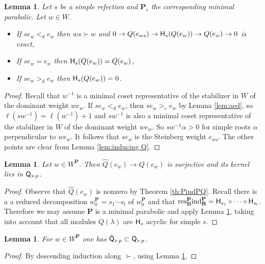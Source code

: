 \documentclass[sn-mathphys-num]{sn-jnl}%
\newcommand{\ind}{{\mathrm{ind}}}
\newcommand{\res}{{\mathrm{res}}}
\newcommand{\sH}{{\sf H}}
\newcommand{\fb}{\mathbf B}
\newcommand{\bp}{\mathbf P}
\newtheorem{lemma}[theorem]{Lemma}
\theoremstyle{definition}
\begin{document}
\begin{lemma}\label{lem:ind of Q(e_w)}
Let $s$ be a simple refection and $\bp_s$ the corresponding minimal parabolic. 
Let $w\in W$.
\begin{itemize}
\item If $se_w<_de_w$ then $ws\succ w$ and $0\to Q(e_{ws})\to{\sH_s}(Q(e_w))\to Q(e_w)\to 0$ is exact,
\item If $se_w=e_w$ then ${\sH_s}(Q(e_w))=Q(e_w)$,
\item If $se_w>_de_w$ then ${\sH_s}(Q(e_w))=0$.
\end{itemize}
\end{lemma}
\begin{proof}Recall that $w^{-1}$ is a minimal coset representative of the stabilizer in $W$ of the dominant weight $we_w$.
    If $se_w<_de_w$, then $se_w>_ee_w$ by Lemma \ref{lem:aed}, so $\ell(sw^{-1})=\ell(w^{-1})+1$ and $sw^{-1}$ is also a minimal coset representative of the stabilizer in $W$ of the dominant weight $we_w$.
    So $sw^{-1}\alpha>0$ for simple roots $\alpha$ perpendicular to  $we_w$. It follows that $se_w$
    is the Steinberg weight $e_{ws}$. The other points are clear from Lemma \ref{lem:inducing Q}.
\end{proof}
\begin{lemma}\label{lem:indP of Q(e_w)}
Let $w\in W^\bp$.
Then $\hat Q(e_w)\to Q(e_w)$ is surjective and its kernel lies in ${\sf Q}_{\succ p}$.
\end{lemma}
\begin{proof}
Observe that $\hat Q(e_w)$ is nonzero by Theorem \ref{th:PindPQ}. Recall there is a a reduced decomposition  $w_0^{\bp}=s_{1}\cdots s_{l}$ of $w_0^\bp$ and that $\res^\bp_\fb\ind_\fb^\bp=\sH_{s_{1}}\circ\cdots\circ\sH_{s_{l}}$.  Therefore we may assume $\bp$ is a minimal parabolic and apply Lemma \ref{lem:ind of Q(e_w)}, taking into account that all modules $Q(\lambda)$ are 
$\sH_{s}$ acyclic for simple $s$.
\end{proof}

\begin{lemma}\label{lem:inclusion of hat}
For $w\in W^\bp$ one has $\hat{\sf Q}_{\succ p}\subset {\sf Q}_{\succ p}$.
\end{lemma}
\begin{proof}
By descending induction along $\succ$, using Lemma \ref{lem:indP of Q(e_w)}.
\end{proof}
\end{document}
